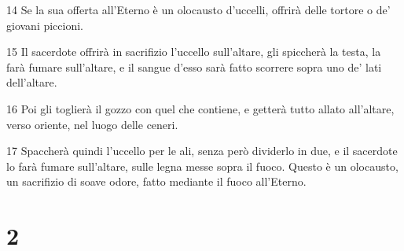 \par 14 Se la sua offerta all'Eterno è un olocausto d'uccelli, offrirà delle tortore o de' giovani piccioni.
\par 15 Il sacerdote offrirà in sacrifizio l'uccello sull'altare, gli spiccherà la testa, la farà fumare sull'altare, e il sangue d'esso sarà fatto scorrere sopra uno de' lati dell'altare.
\par 16 Poi gli toglierà il gozzo con quel che contiene, e getterà tutto allato all'altare, verso oriente, nel luogo delle ceneri.
\par 17 Spaccherà quindi l'uccello per le ali, senza però dividerlo in due, e il sacerdote lo farà fumare sull'altare, sulle legna messe sopra il fuoco. Questo è un olocausto, un sacrifizio di soave odore, fatto mediante il fuoco all'Eterno.

\chapter{2}


